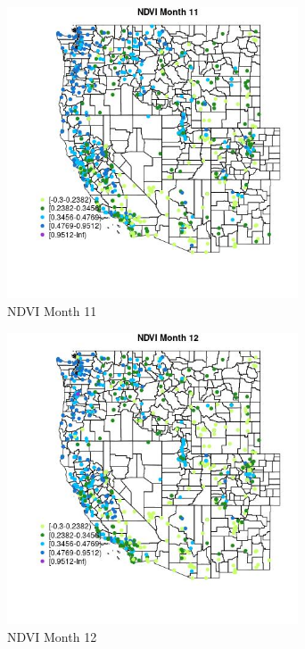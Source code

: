 \begin{figure} 
\centering  
\includegraphics[width=0.77\textwidth]{Code_Outputs/Report_ML_input_PM25_Step4_part_f_de_duplicated_aveswNAs_MapObsMo11NDVI.jpg} 
\caption{\label{fig:Report_ML_input_PM25_Step4_part_f_de_duplicated_aveswNAsMapObsMo11NDVI}NDVI Month 11} 
\end{figure} 
 

\begin{figure} 
\centering  
\includegraphics[width=0.77\textwidth]{Code_Outputs/Report_ML_input_PM25_Step4_part_f_de_duplicated_aveswNAs_MapObsMo12NDVI.jpg} 
\caption{\label{fig:Report_ML_input_PM25_Step4_part_f_de_duplicated_aveswNAsMapObsMo12NDVI}NDVI Month 12} 
\end{figure} 
 
